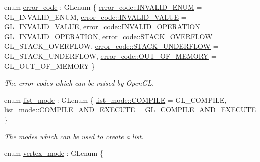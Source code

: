 \begin{DoxyCompactItemize}
enum \hyperlink{namespaceglpp_a1fe5e1dcc793337b3958e3cd2352432c}{error\+\_\+code} \+: G\+Lenum \{ \newline
\hyperlink{namespaceglpp_a1fe5e1dcc793337b3958e3cd2352432ca9164aca5dd48cdf8784d25ba15863214}{error\+\_\+code\+::\+I\+N\+V\+A\+L\+I\+D\+\_\+\+E\+N\+UM} = G\+L\+\_\+\+I\+N\+V\+A\+L\+I\+D\+\_\+\+E\+N\+UM, 
\hyperlink{namespaceglpp_a1fe5e1dcc793337b3958e3cd2352432cad8f24f388e990b9ccf8905b7993b99ae}{error\+\_\+code\+::\+I\+N\+V\+A\+L\+I\+D\+\_\+\+V\+A\+L\+UE} = G\+L\+\_\+\+I\+N\+V\+A\+L\+I\+D\+\_\+\+V\+A\+L\+UE, 
\hyperlink{namespaceglpp_a1fe5e1dcc793337b3958e3cd2352432cade918d7abaea4c856c3c64720f3cbb7c}{error\+\_\+code\+::\+I\+N\+V\+A\+L\+I\+D\+\_\+\+O\+P\+E\+R\+A\+T\+I\+ON} = G\+L\+\_\+\+I\+N\+V\+A\+L\+I\+D\+\_\+\+O\+P\+E\+R\+A\+T\+I\+ON, 
\hyperlink{namespaceglpp_a1fe5e1dcc793337b3958e3cd2352432caaf5dcc114f4d3618802f0cd7bad2ccd8}{error\+\_\+code\+::\+S\+T\+A\+C\+K\+\_\+\+O\+V\+E\+R\+F\+L\+OW} = G\+L\+\_\+\+S\+T\+A\+C\+K\+\_\+\+O\+V\+E\+R\+F\+L\+OW, 
\newline
\hyperlink{namespaceglpp_a1fe5e1dcc793337b3958e3cd2352432ca4a0a7f755cbb064fb44e2201ab5c57c4}{error\+\_\+code\+::\+S\+T\+A\+C\+K\+\_\+\+U\+N\+D\+E\+R\+F\+L\+OW} = G\+L\+\_\+\+S\+T\+A\+C\+K\+\_\+\+U\+N\+D\+E\+R\+F\+L\+OW, 
\hyperlink{namespaceglpp_a1fe5e1dcc793337b3958e3cd2352432cac56ddb8056b120c9d5fee05981f219c6}{error\+\_\+code\+::\+O\+U\+T\+\_\+\+O\+F\+\_\+\+M\+E\+M\+O\+RY} = G\+L\+\_\+\+O\+U\+T\+\_\+\+O\+F\+\_\+\+M\+E\+M\+O\+RY
 \}\begin{DoxyCompactList}\small\item\em The error codes which can be raised by Open\+GL. \end{DoxyCompactList}
\item 
enum \hyperlink{namespaceglpp_ae04b58b8004d97440233b5c65fe75748}{list\+\_\+mode} \+: G\+Lenum \{ \hyperlink{namespaceglpp_ae04b58b8004d97440233b5c65fe75748a6789cf817caacc2139464fd540bef728}{list\+\_\+mode\+::\+C\+O\+M\+P\+I\+LE} = G\+L\+\_\+\+C\+O\+M\+P\+I\+LE, 
\hyperlink{namespaceglpp_ae04b58b8004d97440233b5c65fe75748a06b0d36009966b5af07a9241242efea0}{list\+\_\+mode\+::\+C\+O\+M\+P\+I\+L\+E\+\_\+\+A\+N\+D\+\_\+\+E\+X\+E\+C\+U\+TE} = G\+L\+\_\+\+C\+O\+M\+P\+I\+L\+E\+\_\+\+A\+N\+D\+\_\+\+E\+X\+E\+C\+U\+TE
 \}\begin{DoxyCompactList}\small\item\em The modes which can be used to create a list. \end{DoxyCompactList}
\item 
enum \hyperlink{namespaceglpp_a3d4cc897229caf80f6712debc078a265}{vertex\+\_\+mode} \+: G\+Lenum \{ \newline

\end{DoxyCompactItemize}

